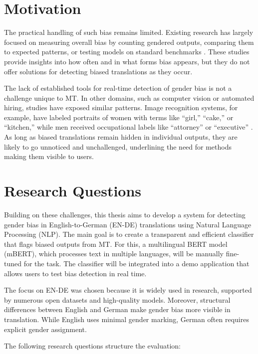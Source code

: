 \section{Motivation}
    The practical handling of such bias remains limited. Existing research has largely focused on measuring overall bias by counting gendered outputs, comparing them to expected patterns, or testing models on standard benchmarks \parencite{rescignoGenderBiasMachine2023,barclayInvestigatingMarkersDrivers2024a,pratesAssessingGenderBias2019,savoldiWhatHarmQuantifying2024}. These studies provide insights into how often and in what forms bias appears, but they do not offer solutions for detecting biased translations as they occur.

    The lack of established tools for real-time detection of gender bias is not a challenge unique to MT. In other domains, such as computer vision or automated hiring, studies have exposed similar patterns. Image recognition systems, for example, have labeled portraits of women with terms like “girl,” “cake,” or “kitchen,” while men received occupational labels like “attorney” or “executive” \parencite{schwemmerDiagnosingGenderBias2020}. As long as biased translations remain hidden in individual outputs, they are likely to go unnoticed and unchallenged, underlining the need for methods making them visible to users.

\section{Research Questions}
  Building on these challenges, this thesis aims to develop a system for detecting gender bias in English-to-German (EN-DE) translations using Natural Language Processing (NLP). The main goal is to create a transparent and efficient classifier that flags biased outputs from MT. For this, a multilingual BERT model (mBERT), which processes text in multiple languages, will be manually fine-tuned for the task. The classifier will be integrated into a demo application that allows users to test bias detection in real time.

    The focus on EN-DE was chosen because it is widely used in research, supported by numerous open datasets and high-quality models. Moreover, structural differences between English and German make gender bias more visible in translation. While English uses minimal gender marking, German often requires explicit gender assignment.

    The following research questions structure the evaluation:

